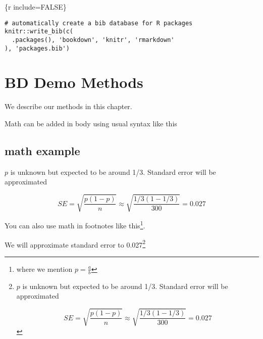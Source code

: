 \documentclass[
]{book}
\begin{document}
\{r include=FALSE\}

\begin{verbatim}
# automatically create a bib database for R packages
knitr::write_bib(c(
  .packages(), 'bookdown', 'knitr', 'rmarkdown'
), 'packages.bib')
\end{verbatim}

\chapter{BD Demo Methods}\label{bd-demo-methods}

We describe our methods in this chapter.

Math can be added in body using usual syntax like this

\section{math example}\label{math-example}

\(p\) is unknown but expected to be around 1/3. Standard error will be approximated

\[
SE = \sqrt{\frac{p(1-p)}{n}} \approx \sqrt{\frac{1/3 (1 - 1/3)} {300}} = 0.027
\]

You can also use math in footnotes like this\footnote{where we mention \(p = \frac{a}{b}\)}.

We will approximate standard error to 0.027\footnote{\(p\) is unknown but expected to be around 1/3. Standard error will be approximated

  \[
  SE = \sqrt{\frac{p(1-p)}{n}} \approx \sqrt{\frac{1/3 (1 - 1/3)} {300}} = 0.027
  \]}

  
\end{document}
